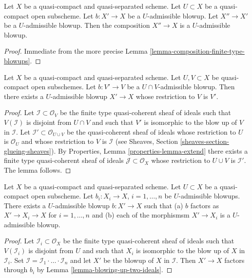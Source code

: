 \begin{lemma}
\label{lemma-composition-admissible-blowups}
Let $X$ be a quasi-compact and quasi-separated scheme.
Let $U \subset X$ be a quasi-compact open subscheme.
Let $b : X' \to X$ be a $U$-admissible blowup.
Let $X'' \to X'$ be a $U$-admissible blowup.
Then the composition $X'' \to X$ is a $U$-admissible blowup.
\end{lemma}

\begin{proof}
Immediate from the more precise
Lemma \ref{lemma-composition-finite-type-blowups}.
\end{proof}

\begin{lemma}
\label{lemma-extend-admissible-blowups}
Let $X$ be a quasi-compact and quasi-separated scheme.
Let $U, V \subset X$ be quasi-compact open subschemes.
Let $b : V' \to V$ be a $U \cap V$-admissible blowup.
Then there exists a $U$-admissible blowup $X' \to X$
whose restriction to $V$ is $V'$.
\end{lemma}

\begin{proof}
Let $\mathcal{I} \subset \mathcal{O}_V$ be the finite type
quasi-coherent sheaf of ideals such that $V(\mathcal{I})$ is
disjoint from $U \cap V$ and such that $V'$ is isomorphic to the
blow up of $V$ in $\mathcal{I}$. Let
$\mathcal{I}' \subset \mathcal{O}_{U \cup V}$ be the quasi-coherent
sheaf of ideals whose restriction to $U$ is $\mathcal{O}_U$ and
whose restriction to $V$ is $\mathcal{I}$ (see Sheaves, Section
\ref{sheaves-section-glueing-sheaves}).
By Properties, Lemma \ref{properties-lemma-extend}
there exists a finite type quasi-coherent sheaf of ideals
$\mathcal{J} \subset \mathcal{O}_X$ whose restriction to $U \cup V$ is
$\mathcal{I}'$. The lemma follows.
\end{proof}

\begin{lemma}
\label{lemma-dominate-admissible-blowups}
Let $X$ be a quasi-compact and quasi-separated scheme.
Let $U \subset X$ be a quasi-compact open subscheme.
Let $b_i : X_i \to X$, $i = 1, \ldots, n$ be $U$-admissible blowups.
There exists a $U$-admissible blowup $b : X' \to X$ such that
(a) $b$ factors as $X' \to X_i \to X$ for $i = 1, \ldots, n$ and
(b) each of the morphismsm $X' \to X_i$ is a $U$-admissible blowup.
\end{lemma}

\begin{proof}
Let $\mathcal{I}_i \subset \mathcal{O}_X$ be the finite type
quasi-coherent sheaf of ideals such that $V(\mathcal{I}_i)$ is
disjoint from $U$ and such that $X_i$ is isomorphic to the
blow up of $X$ in $\mathcal{I}_i$. Set
$\mathcal{I} = \mathcal{I}_1 \cdot \ldots \cdot \mathcal{I}_n$
and let $X'$ be the blowup of $X$ in $\mathcal{I}$. Then
$X' \to X$ factors through $b_i$ by Lemma \ref{lemma-blowing-up-two-ideals}.
\end{proof}

